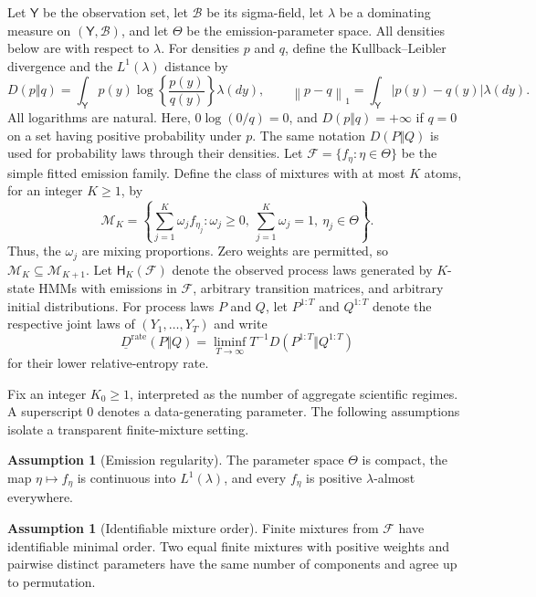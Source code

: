 \documentclass[11pt]{article}
\theoremstyle{definition}
\newtheorem{assumption}[theorem]{Assumption}
\newcommand{\Fcal}{\mathcal{F}}
\newcommand{\Mcal}{\mathcal{M}}
\newcommand{\Hcal}{\mathsf{H}}
\newcommand{\Yspace}{\mathsf{Y}}
\newcommand{\norm}[1]{\left\lVert #1\right\rVert}
\begin{document}
Let $\Yspace$ be the observation set, let $\mathcal B$ be its sigma-field, let
$\lambda$ be a dominating measure on $(\Yspace,\mathcal B)$, and let $\Theta$
be the emission-parameter space. All
densities below are with respect to $\lambda$. For densities $p$ and $q$, define
the Kullback--Leibler divergence and the $L^1(\lambda)$ distance by
\begin{equation*}
 D(p\Vert q)=\int_{\Yspace}p(y)\log\!\left\{\frac{p(y)}{q(y)}\right\}\lambda(dy),
 \qquad
 \norm{p-q}_1=\int_{\Yspace}|p(y)-q(y)|\lambda(dy).
\end{equation*}
All logarithms are natural. Here, $0\log(0/q)=0$, and $D(p\Vert q)=+\infty$ if $q=0$ on a set having
positive probability under $p$. The same notation $D(P\Vert Q)$ is used for
probability laws through their densities. Let
$\Fcal=\{f_\eta:\eta\in\Theta\}$ be the simple fitted emission family. Define
the class of mixtures with at most $K$ atoms, for an integer $K\geq1$, by
\begin{equation*}
 \Mcal_K=\left\{\sum_{j=1}^K\omega_j f_{\eta_j}:
 \omega_j\geq0,\ \sum_{j=1}^K\omega_j=1,\ \eta_j\in\Theta\right\}.
\end{equation*}
Thus, the $\omega_j$ are mixing proportions. Zero weights are permitted, so
$\Mcal_K\subseteq\Mcal_{K+1}$. Let $\Hcal_K(\Fcal)$ denote the observed
process laws generated by $K$-state HMMs with emissions in $\Fcal$, arbitrary
transition matrices, and arbitrary initial distributions. For process laws $P$
and $Q$, let $P^{1:T}$ and $Q^{1:T}$ denote the respective joint laws of
$(Y_1,\ldots,Y_T)$ and write
\begin{equation*}
 \underline D^{\mathrm{rate}}(P\Vert Q)
 =\liminf_{T\to\infty}T^{-1}D(P^{1:T}\Vert Q^{1:T})
\end{equation*}
for their lower relative-entropy rate.

Fix an integer $K_0\geq1$, interpreted as the number of aggregate scientific
regimes. A superscript $0$ denotes a data-generating parameter. The
following assumptions isolate a transparent finite-mixture setting.

\begin{assumption}[Emission regularity]\label{ass:regularity}
The parameter space $\Theta$ is compact, the map $\eta\mapsto f_\eta$ is
continuous into $L^1(\lambda)$, and every $f_\eta$ is positive
$\lambda$-almost everywhere.
\end{assumption}

\begin{assumption}[Identifiable mixture order]\label{ass:identifiability}
Finite mixtures from $\Fcal$ have identifiable minimal order. Two equal finite
mixtures with positive weights and pairwise distinct parameters have the same
number of components and agree up to permutation.
\end{assumption}
\end{document}
